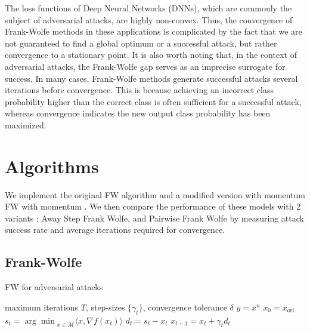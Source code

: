 \documentclass{article}
\begin{document}
The loss functions of Deep Neural Networks (DNNs), which are commonly the subject of adversarial attacks, are highly non-convex. Thus, the convergence of Frank-Wolfe methods in these applications is complicated by the fact that we are not guaranteed to find a global optimum or a successful attack, but rather convergence to a stationary point. 
It is also worth noting that, in the context of adversarial attacks, the Frank-Wolfe gap serves as an imprecise surrogate for success. In many cases, Frank-Wolfe methods generate successful attacks several iterations before convergence. This is because achieving an incorrect class probability higher than the correct class is often sufficient for a successful attack, whereas convergence indicates the new output class probability has been maximized.

\section{Algorithms}
We implement the original FW algorithm and a modified version with momentum FW with momentum \cite{attacks}. We then compare the performance of these models with 2 variants \cite{fw-variants}: Away Step Frank Wolfe, and Pairwise Frank Wolfe by measuring attack success rate and average iterations required for convergence.

\subsection{Frank-Wolfe}
\begin{algorithm}
\caption{FW for adversarial attacks}\label{alg:cap}
\begin{algorithmic}[1]
\Require maximum iterations $T$, step-sizes $\{\gamma_t\}$, convergence tolerance $\delta$
\Ensure $y = x^n$
\State $x_0 = x_{\text{ori}}$
	\State $s_t = {\arg \min}_{x\in\mathcal{M}} \langle x, \nabla f(x_t)\rangle$ 
	\State $d_t = s_t - x_t$
	\State $x_{t+1} = x_t + \gamma_t d_t$
	  \hfill {}
	\EndIf
\EndFor
\end{algorithmic}
\end{algorithm}
\end{document}
